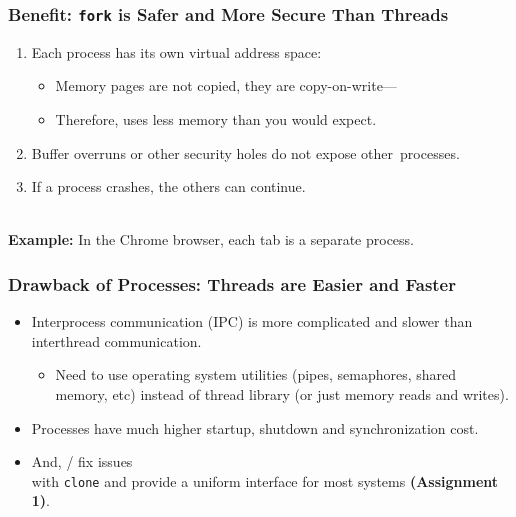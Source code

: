 \begin{frame}[fragile]
  \frametitle{Benefit: {\tt fork} is Safer and More Secure Than Threads}

  \begin{changemargin}{1cm}
  \begin{enumerate}
    \item Each process has its own virtual address space:
      \begin{itemize}
        \item Memory pages are not copied, they are copy-on-write---
        \item Therefore, uses less memory than you would expect.
      \end{itemize}
    \item Buffer overruns or other security holes do not expose other~processes.
    \item If a process crashes, the others can continue.
  \end{enumerate}~\\[1em]
  {\bf Example:} In the Chrome browser, each tab is a separate process.
  \end{changemargin}
\end{frame}

\begin{frame}[fragile]
  \frametitle{Drawback of Processes: Threads are Easier and Faster}

  \begin{changemargin}{1cm}
  \begin{itemize}
    \item Interprocess communication (IPC) is more complicated and slower than interthread
          communication.
      \begin{itemize}
        \item Need to use operating system utilities (pipes, semaphores, shared
              memory, etc) instead of thread library (or just memory reads and writes).
      \end{itemize}
    \item Processes have much higher startup, shutdown and synchronization cost.
    \item And, / fix issues\\ with {\tt clone} and provide a
          uniform interface for most systems {\bf (Assignment 1)}.
  \end{itemize}
  \end{changemargin}

\end{frame}

